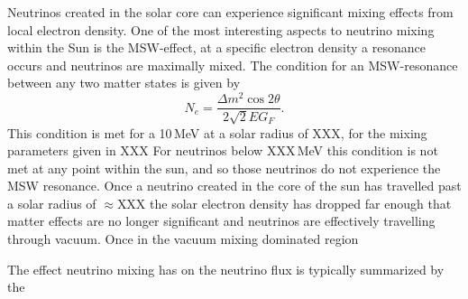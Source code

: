 Neutrinos created in the solar core can experience significant mixing effects from local
electron density.
One of the most interesting aspects to neutrino mixing within the Sun is the MSW-effect,
at a specific electron density a resonance occurs and neutrinos are maximally mixed.
The condition for an MSW-resonance between any two matter states is given by
\begin{equation}
    N_{e} = \frac{\Delta m^{2} \cos2\theta}{2\sqrt{2}EG_{F}}\text{.}
\end{equation}
This condition is met for a 10\,MeV at a solar radius of XXX, for the mixing parameters
given in XXX %
For neutrinos below XXX\,MeV this condition is not met at any point within the sun,
and so those neutrinos do not experience the MSW resonance.
Once a neutrino created in the core of the sun has travelled past a solar radius of $\approx$XXX
the solar electron density has dropped far enough that matter effects are no longer significant
and neutrinos are effectively travelling through vacuum. Once in the vacuum mixing dominated region

The effect neutrino mixing has on the neutrino flux is typically summarized by the
